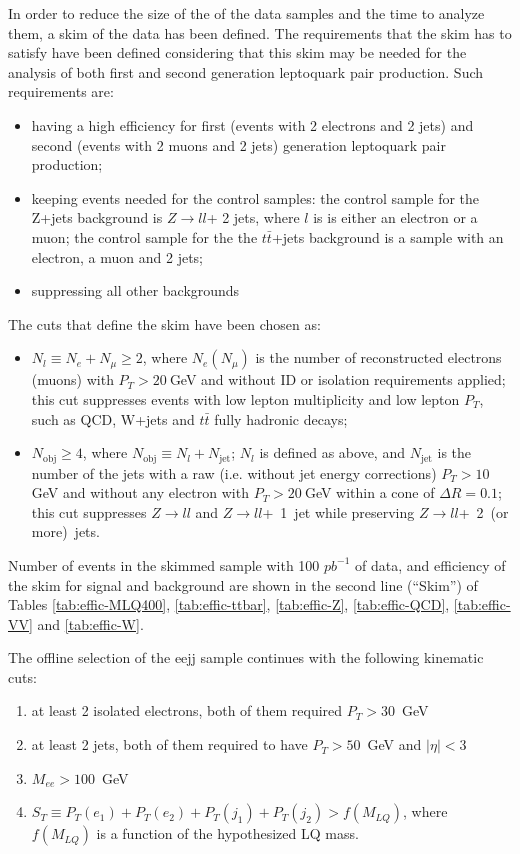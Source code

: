 \documentclass{cmspaper}
\begin{document}
\begin{linenumbers}
In order to reduce the size of the of the data samples and the time to analyze them, a skim of the 
data has been defined.
The requirements that the skim has to satisfy have been defined considering that this skim may be needed
for the analysis of both first and second generation leptoquark pair production. Such requirements are:
\begin{itemize}
\item having a high efficiency for first (events with 2 electrons and 2 jets) and second (events with 
2 muons and 2 jets) generation leptoquark pair production; 
\item keeping events needed for the control samples: the control sample for the Z+jets background is $Z\rightarrow l l$+ 2 jets,
where $l$ is is either an electron or a muon; the control sample for the the $t\bar{t}$+jets background is a sample 
with an electron, a muon and 2 jets;
\item suppressing all other backgrounds
\end{itemize}
The cuts that define the skim have been chosen as:
\begin{itemize}
\item $N_l \equiv N_e + N_{\mu} \ge 2$, where $N_e (N_{\mu})$ is the number of reconstructed electrons (muons)
with $P_T>20~$GeV and without ID or isolation requirements applied; this cut suppresses events with low 
lepton multiplicity and low lepton $P_T$, such as QCD, W+jets and $t\bar{t}$ fully hadronic decays;
\item $N_{\mathrm{obj}} \ge 4$, where $N_{\mathrm{obj}} \equiv N_l + N_{\mathrm{jet}}$; $N_l$ is defined as above, and
$N_{\mathrm{jet}}$ is the number of the jets with a raw (i.e. without jet energy corrections) $P_T > 10~$GeV and without 
any electron with $P_T > 20~$GeV within a cone of $\Delta R=0.1$; this cut suppresses $Z \rightarrow ll$ and 
$Z \rightarrow ll$+~1~jet while preserving $Z \rightarrow ll$+~2~(or more)~jets.
\end{itemize}

Number of events in the skimmed sample with 100 $pb^{-1}$ of data, and 
efficiency of the skim for signal and background are shown in the second line (``Skim'') 
of Tables
\ref{tab:effic-MLQ400}, 
\ref{tab:effic-ttbar}, 
\ref{tab:effic-Z}, 
\ref{tab:effic-QCD},
\ref{tab:effic-VV} and
\ref{tab:effic-W}.

The offline selection of the eejj sample continues with the following kinematic cuts:
%
\begin{enumerate}
\item at least 2 isolated electrons, both of them required $P_T>30$~GeV 
\item at least 2 jets, both of them required to have $P_T>50$~GeV and $|\eta|<3$
\item $M_{ee}>100$~GeV
\item $S_T\equiv P_T(e_1)+P_T(e_2)+P_T(j_1)+P_T(j_2)>f(M_{LQ})$, where $f(M_{LQ})$ is a function 
of the hypothesized LQ mass.
\end{enumerate}
%


\end{linenumbers}
\end{document}

